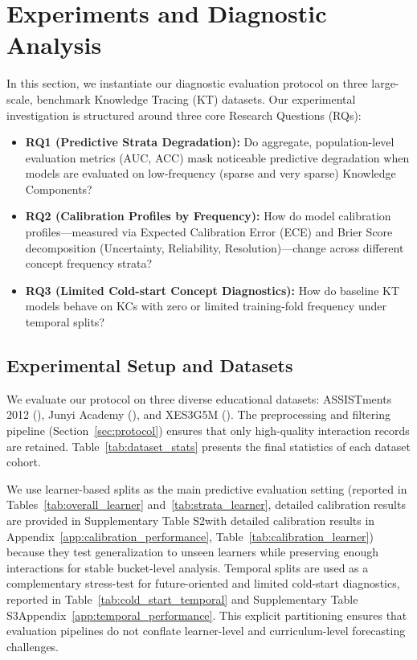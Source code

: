 \section{Experiments and Diagnostic Analysis}
\label{sec:experiments}

In this section, we instantiate our diagnostic evaluation protocol on three large-scale, benchmark Knowledge Tracing (KT) datasets. Our experimental investigation is structured around three core Research Questions (RQs):
\begin{itemize}
    \item \textbf{RQ1 (Predictive Strata Degradation):} Do aggregate, population-level evaluation metrics (AUC, ACC) mask noticeable predictive degradation when models are evaluated on low-frequency (sparse and very sparse) Knowledge Components?
    \item \textbf{RQ2 (Calibration Profiles by Frequency):} How do model calibration profiles—measured via Expected Calibration Error (ECE) and Brier Score decomposition (Uncertainty, Reliability, Resolution)—change across different concept frequency strata?
    \item \textbf{RQ3 (Limited Cold-start Concept Diagnostics):} How do baseline KT models behave on KCs with zero or limited training-fold frequency under temporal splits?
\end{itemize}

\subsection{Experimental Setup and Datasets}
We evaluate our protocol on three diverse educational datasets: ASSISTments 2012 (), Junyi Academy (), and XES3G5M (). The preprocessing and filtering pipeline (Section~\ref{sec:protocol}) ensures that only high-quality interaction records are retained. Table~\ref{tab:dataset_stats} presents the final statistics of each dataset cohort.

We use learner-based splits as the main predictive evaluation setting (reported in Tables~\ref{tab:overall_learner} and~\ref{tab:strata_learner}, \ifdefined\iscompact detailed calibration results are provided in Supplementary Table S2\else with detailed calibration results in Appendix~\ref{app:calibration_performance}, Table~\ref{tab:calibration_learner}\fi) because they test generalization to unseen learners while preserving enough interactions for stable bucket-level analysis. Temporal splits are used as a complementary stress-test for future-oriented and limited cold-start diagnostics, reported in Table~\ref{tab:cold_start_temporal} and \ifdefined\iscompact Supplementary Table S3\else Appendix~\ref{app:temporal_performance}\fi. This explicit partitioning ensures that evaluation pipelines do not conflate learner-level and curriculum-level forecasting challenges.


